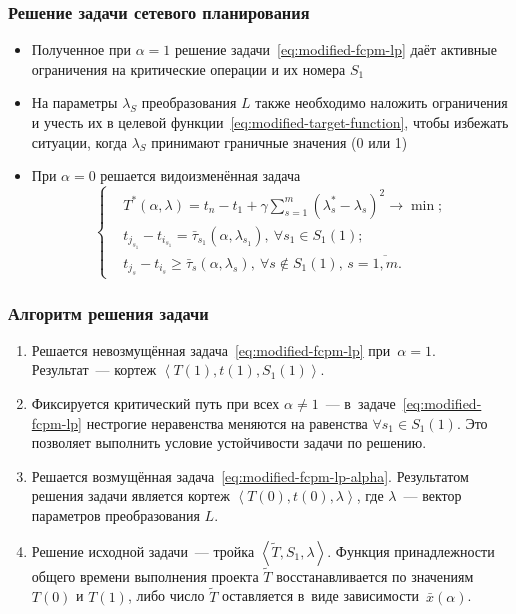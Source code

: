 \documentclass[12pt]{beamer}
\begin{document}
\begin{frame}
  \frametitle{Решение задачи сетевого планирования}
  \begin{itemize}
    \item Полученное при $\alpha=1$ решение задачи~\eqref{eq:modified-fcpm-lp} даёт активные ограничения на критические операции и их номера $S_1$
    \item На параметры $\lambda_S$ преобразования $L$ также необходимо наложить ограничения и учесть их в целевой функции~\eqref{eq:modified-target-function}, чтобы избежать ситуации, когда $\lambda_S$ принимают граничные значения (0 или 1)
    \item При $\alpha = 0$ решается видоизменённая задача
      \begin{equation}
      \label{eq:modified-fcpm-lp-alpha}
        \left \{ \begin{aligned}
          & T^* \left(\alpha, \lambda \right) = t_n-t_1+\gamma \sum \limits_{s=1}^{m} \left(\lambda_s^*-\lambda_s \right)^2 \to \min; \\
          & t_{j_{s_1}}-t_{i_{s_1}} = \bar{\tau}_{s_1}\left(\alpha, \lambda_{s_1} \right),\ \forall s_1 \in S_1\left(1\right); \\
          & t_{j_s}-t_{i_s} \geqslant \bar{\tau}_s\left(\alpha, \lambda_s \right),\ \forall s \notin S_1\left(1\right),\,s=\overline{1,m}.
        \end{aligned} \right.
      \end{equation}
  \end{itemize}
\end{frame}

\begin{frame}
  \frametitle{Алгоритм решения задачи}
\begin{enumerate}
  \item Решается невозмущённая задача~\eqref{eq:modified-fcpm-lp} при~$\alpha=1$. Результат~--- кортеж $\left \langle T\left(1\right), t\left(1\right), S_1\left(1\right) \right \rangle$.
  \item Фиксируется критический путь при всех $\alpha \neq 1$~--- в~задаче~\eqref{eq:modified-fcpm-lp} нестрогие неравенства меняются на равенства $\forall s_1 \in S_1\left(1\right)$. Это позволяет выполнить условие устойчивости задачи по решению.
  \item Решается возмущённая задача~\eqref{eq:modified-fcpm-lp-alpha}. Результатом решения задачи является кортеж $\left \langle T\left(0\right), t\left(0\right), \lambda \right \rangle$, где $\lambda$~--- вектор параметров преобразования $L$.
  \item Решение исходной задачи~--- тройка $\left \langle \tilde T, S_1, \lambda \right \rangle$. Функция принадлежности общего времени выполнения проекта $\tilde T$ восстанавливается по значениям $T\left(0\right)$ и $T\left(1\right)$, либо число $\tilde T$ оставляется в~виде зависимости~$\bar x \left(\alpha \right)$.
\end{enumerate}
\end{frame}
\end{document}
